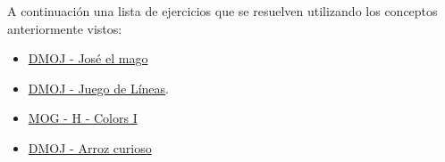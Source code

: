 A continuación una lista de ejercicios que se resuelven utilizando los conceptos anteriormente vistos:

\begin{itemize}
	\item \href{https://dmoj.uclv.edu.cu/problem/jmago}{DMOJ - José el mago}
	\item \href{https://dmoj.uclv.edu.cu/problem/lines}{DMOJ - Juego de Líneas}.
	\item \href{https://matcomgrader.com/problem/9597/colors-i/}{MOG - H - Colors I}
	\item \href{https://dmoj.uclv.edu.cu/problem/acurioso}{DMOJ - Arroz curioso}
\end{itemize}